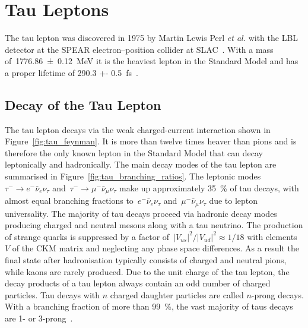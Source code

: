\section{Tau Leptons}

The tau lepton was discovered in 1975 by Martin Lewis Perl \textit{et al.} with
the LBL detector at the SPEAR electron--position collider at SLAC~\cite{perl}.
With a mass of~\SI{1776.86 +- 0.12}{\MeV} it is the heaviest lepton in the
Standard Model and has a proper lifetime of \SI{290.3 +-
  0.5}{\femto\second}~\cite{pdg}.

\subsection{Decay of the Tau Lepton}

The tau lepton decays via the weak charged-current interaction shown in
Figure~\ref{fig:tau_feynman}. It is more than twelve times heaver than pions and
is therefore the only known lepton in the Standard Model that can decay
leptonically and hadronically. The main decay modes of the tau lepton are
summarised in Figure~\ref{fig:tau_branching_ratios}. The leptonic
modes~\mbox{$\tau^- \to e^- \bar{\nu}_e \nu_\tau$}
and~\mbox{$\tau^- \to \mu^- \bar{\nu}_\mu \nu_\tau$} make up approximately
\SI{35}{\percent} of tau decays, with almost equal branching fractions
to~$e^- \bar{\nu}_e \nu_\tau$ and~$\mu^- \bar{\nu}_\mu \nu_\tau$ due to lepton
universality. The majority of tau decays proceed via hadronic decay modes
producing charged and neutral mesons along with a tau neutrino. The production
of strange quarks is suppressed by a factor
of~$|V_{us}|^2 / |V_{ud}|^2 \approx 1/18$ with elements~$V$ of the CKM matrix
and neglecting any phase space differences. As a result the final state after
hadronisation typically consists of charged and neutral pions, while kaons are
rarely produced. Due to the unit charge of the tau lepton, the decay products of
a tau lepton always contain an odd number of charged particles. Tau decays with
$n$ charged daughter particles are called $n$-prong decays. With a branching
fraction of more than \SI{99}{\percent}, the vast majority of taus decays are 1-
or 3-prong~\cite{pdg}. 

